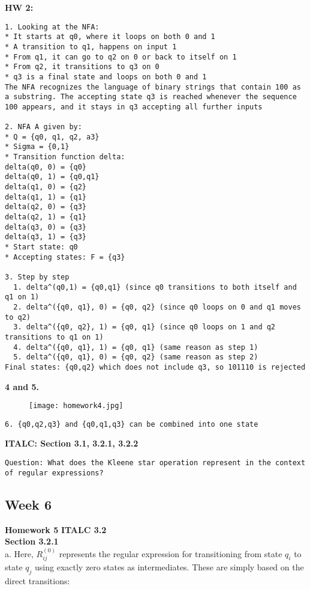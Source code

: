 \documentclass{article}
\theoremstyle{theorem}
\theoremstyle{definition}
\theoremstyle{remark}
\begin{document}
\textbf{HW 2:} 
\begin{lstlisting}
1. Looking at the NFA:
* It starts at q0, where it loops on both 0 and 1
* A transition to q1, happens on input 1
* From q1, it can go to q2 on 0 or back to itself on 1
* From q2, it transitions to q3 on 0
* q3 is a final state and loops on both 0 and 1
The NFA recognizes the language of binary strings that contain 100 as a substring. The accepting state q3 is reached whenever the sequence 100 appears, and it stays in q3 accepting all further inputs

2. NFA A given by:
* Q = {q0, q1, q2, a3}
* Sigma = {0,1}
* Transition function delta:
delta(q0, 0) = {q0}
delta(q0, 1) = {q0,q1}
delta(q1, 0) = {q2}
delta(q1, 1) = {q1}
delta(q2, 0) = {q3}
delta(q2, 1) = {q1}
delta(q3, 0) = {q3}
delta(q3, 1) = {q3}
* Start state: q0
* Accepting states: F = {q3}

3. Step by step
  1. delta^(q0,1) = {q0,q1} (since q0 transitions to both itself and q1 on 1)
  2. delta^({q0, q1}, 0) = {q0, q2} (since q0 loops on 0 and q1 moves to q2)
  3. delta^({q0, q2}, 1) = {q0, q1} (since q0 loops on 1 and q2 transitions to q1 on 1)
  4. delta^({q0, q1}, 1) = {q0, q1} (same reason as step 1)
  5. delta^({q0, q1}, 0) = {q0, q2} (same reason as step 2)
Final states: {q0,q2} which does not include q3, so 101110 is rejected
\end{lstlisting}
\textbf{4 and 5. }\\
\begin{figure}[h] %
    \centering
    \texttt{[image: homework4.jpg]} %
    \caption{}
\end{figure}

\begin{lstlisting}
6. {q0,q2,q3} and {q0,q1,q3} can be combined into one state

\end{lstlisting}
 
\textbf{ITALC: Section 3.1, 3.2.1, 3.2.2}
\begin{lstlisting}
Question: What does the Kleene star operation represent in the context of regular expressions?
\end{lstlisting}

\subsection{Week 6}
\textbf{Homework 5}
\textbf{ITALC 3.2} \\
\textbf{Section 3.2.1} \\
a. Here, \( R_{ij}^{(0)} \) represents the regular expression for transitioning from state \( q_i \) to state \( q_j \) using exactly zero states as intermediates. These are simply based on the direct transitions:
\end{document}
